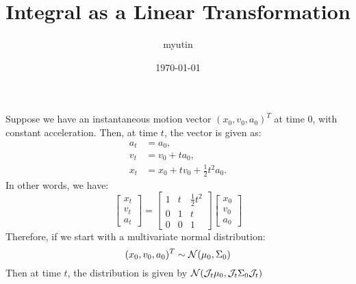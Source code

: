 \documentclass{article}
\begin{document}
\title{Integral as a Linear Transformation}
\author{myutin}
\date{\today}
\maketitle

Suppose we have an instantaneous motion vector $ (x _0, v _0, a _0) ^T $ at time $ 0 $, with constant acceleration. Then, at time $ t $, the vector is given as:
\begin{align*}
	a _t &= a _0 ,\\
	v _t &= v _0 + t a _0 ,\\
	x _t &= x _0 + t v _0 + \tfrac{1}{2} t ^2 a _0
.\end{align*}
In other words, we have:
\[
	\begin{bmatrix}
		x _t \\ v _t \\ a _t
	\end{bmatrix}
	=
	\begin{bmatrix}
		1 & t & \tfrac{1}{2} t ^2 \\
		0 & 1 & t \\
		0 & 0 & 1
	\end{bmatrix}
	\begin{bmatrix}
		x _0 \\ v _0 \\ a _0
	\end{bmatrix}
\]
Therefore, if we start with a multivariate normal distribution:
\[ (x _0, v _0, a _0) ^T \sim {\cal N}(\mu _0, \Sigma _0) \]
Then at time $ t $, the distribution is given by $ {\cal N}({\cal J} _t \mu _0, {\cal J} _t \Sigma _0 {\cal J} _t) $
\end{document}
